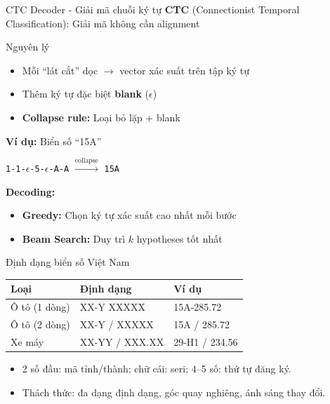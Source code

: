 \begin{frame}{CTC Decoder - Giải mã chuỗi ký tự}
    \textbf{CTC} (Connectionist Temporal Classification): Giải mã không cần alignment
    
    \begin{block}{Nguyên lý}
    \begin{itemize}
        \item Mỗi ``lát cắt'' dọc $\rightarrow$ vector xác suất trên tập ký tự
        \item Thêm ký tự đặc biệt \textbf{blank} ($\epsilon$)
        \item \textbf{Collapse rule:} Loại bỏ lặp + blank
    \end{itemize}
    \end{block}
    
    \textbf{Ví dụ:} Biển số ``15A''
    \begin{center}
    \small
    \texttt{1-1-$\epsilon$-5-$\epsilon$-A-A} $\xrightarrow{\text{collapse}}$ \texttt{15A}
    \end{center}
    
    \vspace{0.3em}
    \textbf{Decoding:}
    \begin{itemize}
        \item \textbf{Greedy:} Chọn ký tự xác suất cao nhất mỗi bước
        \item \textbf{Beam Search:} Duy trì $k$ hypotheses tốt nhất
    \end{itemize}
\end{frame}

\begin{frame}{Định dạng biển số Việt Nam}
    \begin{table}
        \centering
        \begin{tabular}{lll}
            \toprule
            \textbf{Loại} & \textbf{Định dạng} & \textbf{Ví dụ} \\
            \midrule
            Ô tô (1 dòng) & XX-Y XXXXX & 15A-285.72 \\
            Ô tô (2 dòng) & XX-Y / XXXXX & 15A / 285.72 \\
            Xe máy & XX-YY / XXX.XX & 29-H1 / 234.56 \\
            \bottomrule
        \end{tabular}
    \end{table}

    \begin{itemize}
        \item 2 số đầu: mã tỉnh/thành; chữ cái: seri; 4--5 số: thứ tự đăng ký.
        \item Thách thức: đa dạng định dạng, góc quay nghiêng, ánh sáng thay đổi.
    \end{itemize}
\end{frame}

